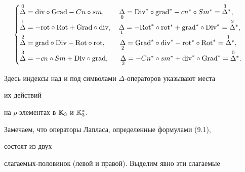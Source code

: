 \begin{equation} 


\begin{cases} 


\up{0}{\Delta}=\text{div}\circ\text{Grad}-Cn\circ sm,\qquad 


\down{0}{\Delta}=\text{Div}^*\circ\text{grad}^*-cn^*\circ 


Sm^*=\up{3}{\Delta}{}^*, \\ 


% 


\up{1}{\Delta}=-\text{rot}\circ\text{Rot}+\text{Grad}\circ\text{div}, 


\quad 


\down{1}{\Delta}=-\text{Rot}^*\circ\text{rot}^*+ 


\text{grad}^*\circ\text{Div}^* 


=\up{2}{\Delta}{}^*, \\


% 


\up{2}{\Delta}=\text{grad}\circ\text{Div}-\text{Rot}\circ\text{rot}, 


\qquad 


\down{2}{\Delta}=\text{Grad}^*\circ\text{div}^*- 


\text{rot}^*\circ\text{Rot}^* 


=\up{1}{\Delta}{}^*, \\ 


% 


\up{3}{\Delta}=-cn\circ Sm+\text{Div}\circ\text{grad}, 


\ \;\quad 


\down{3}{\Delta}=-Cn^*\circ sm^*+ 


\text{div}^*\circ\text{Grad}^* 


=\up{0}{\Delta}{}^*.


\end{cases} 


\end{equation} 


Здесь индексы над и под символами $\Delta$-операторов указывают места 


их действий 


на $p$-элементах в $\Bbb K_3$ и $\Bbb K^*_3$. 


 


Замечаем, что операторы Лапласа, определенные формулами (9.1), 


состоят из двух  


сла\-га\-е\-мых-половинок (левой и правой). Выделим явно эти слагаемые 


